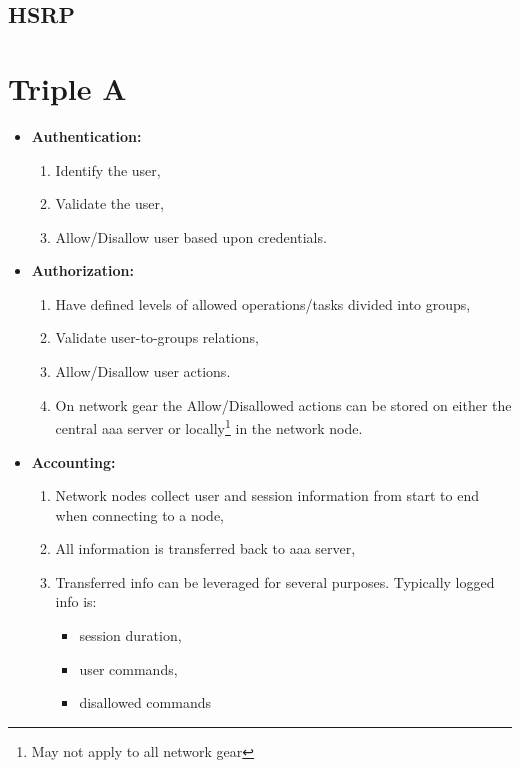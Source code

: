 \documentclass[a4paper,12pt,twoside,twocolumn,landscape]{book}
\begin{document}
\section{HSRP}


\chapter{Triple A}



\newpage

\begin{itemize}
    \item \textbf{Authentication:}
    \begin{enumerate}
        \item Identify the user,
        \item Validate the user,
        \item Allow/Disallow user based upon credentials.
    \end{enumerate}
    \item \textbf{Authorization:}
    \begin{enumerate}
        \item Have defined levels of allowed operations/tasks divided into groups,
        \item Validate user-to-groups relations,
        \item Allow/Disallow user actions.
        \item On network gear the Allow/Disallowed actions can be stored on either the central \acrshort{aaa} server or locally\footnote{May not apply to all network gear} in the network node.
    \end{enumerate}
    \item \textbf{Accounting:}
    \begin{enumerate}
        \item Network nodes collect user and session information from start to end when connecting to a node,
        \item All information is transferred back to \acrshort{aaa} server,
        \item Transferred info can be leveraged for several purposes. Typically logged info is:
        \begin{itemize}
            \item session duration,
            \item user commands,
            \item disallowed commands
        \end{itemize}
    \end{enumerate}
\end{itemize}
\end{document}
